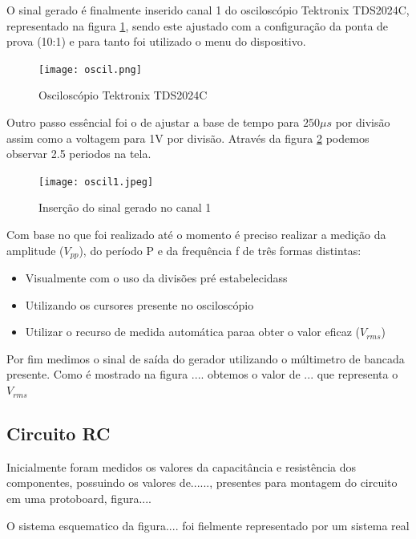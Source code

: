 \documentclass[a4paper,12pt,onecolumn]{article}
\numberwithin{equation}{section}
\numberwithin{figure}{section}
\begin{document}
O sinal gerado é finalmente inserido canal 1 do osciloscópio Tektronix TDS2024C, representado na figura \ref{osc}, sendo este ajustado com a configuração da ponta de prova (10:1) e para tanto foi utilizado o menu do dispositivo.

\begin{figure}[H]
  \centering
  \texttt{[image: oscil.png]}
  \caption{Osciloscópio Tektronix TDS2024C}
  \label{osc}
\end{figure}

Outro passo essêncial foi o de ajustar a base de tempo para $250 \mu s$ por divisão assim como a voltagem para 1V por divisão. Através da figura \ref{osc1} podemos observar 2.5 periodos na tela.

\begin{figure}[H]
  \centering
  \texttt{[image: oscil1.jpeg]}
  \caption{Inserção do sinal gerado no canal 1}
  \label{osc1}
\end{figure}

Com base no que foi realizado até o momento é preciso realizar a medição da amplitude ($V_{pp}$), do período P e da frequência f de três formas distintas:

\begin{itemize}
\item Visualmente com o uso da divisões pré estabelecidass
\item Utilizando os cursores presente no osciloscópio
\item Utilizar o recurso de medida automática paraa obter o valor eficaz ($V_{rms}$)
\end{itemize}


Por fim medimos o sinal de saída do gerador utilizando o múltimetro de bancada presente. Como é mostrado na figura .... obtemos o valor de ... que representa o $V_{rms}$ 


\subsection{Circuito RC}
Inicialmente foram medidos os valores da capacitância e resistência dos componentes, possuindo os valores de......, presentes para montagem do circuito em uma protoboard, figura....


O sistema esquematico da figura.... foi fielmente representado por um sistema real 
\end{document}
